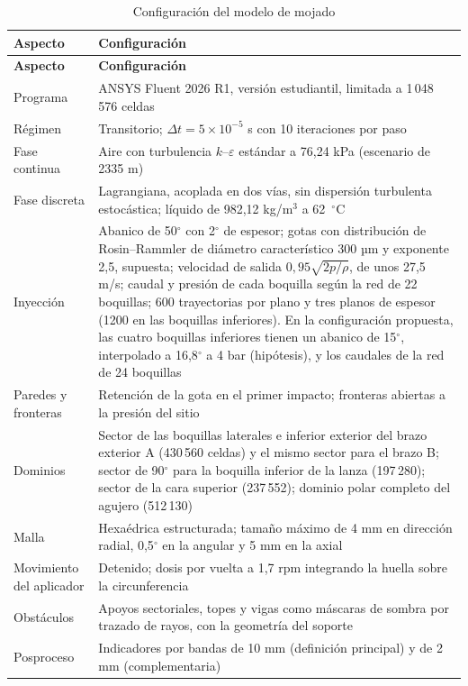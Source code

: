 \begingroup
\small\singlespacing
\setlength{\tabcolsep}{4pt}
\begin{longtable}{@{}>{\raggedright\arraybackslash}p{3.4cm}>{\raggedright\arraybackslash}p{\dimexpr\textwidth-3.4cm-4\tabcolsep\relax}@{}}
\caption{Configuración del modelo de mojado}\label{tab:anx-cfd-config}\\
\toprule
\textbf{Aspecto} & \textbf{Configuración}\\
\midrule\endfirsthead
\toprule
\textbf{Aspecto} & \textbf{Configuración}\\
\midrule\endhead
\bottomrule\endlastfoot
Programa & ANSYS Fluent 2026 R1, versión estudiantil, limitada a 1\,048\,576 celdas\\
Régimen & Transitorio; $\Delta t=5\times10^{-5}$ s con 10 iteraciones por paso\\
Fase continua & Aire con turbulencia $k$--$\varepsilon$ estándar a 76,24 kPa (escenario de 2335 m)\\
Fase discreta & Lagrangiana, acoplada en dos vías, sin dispersión turbulenta estocástica; líquido de 982,12 kg/m$^3$ a 62~$^\circ$C\\
Inyección & Abanico de 50$^\circ$ con 2$^\circ$ de espesor; gotas con distribución de Rosin--Rammler de diámetro característico 300 µm y exponente 2,5, supuesta; velocidad de salida $0{,}95\sqrt{2p/\rho}$, de unos 27,5 m/s; caudal y presión de cada boquilla según la red de 22 boquillas; 600 trayectorias por plano y tres planos de espesor (1200 en las boquillas inferiores). En la configuración propuesta, las cuatro boquillas inferiores tienen un abanico de 15$^\circ$, interpolado a 16,8$^\circ$ a 4 bar (hipótesis), y los caudales de la red de 24 boquillas\\
Paredes y fronteras & Retención de la gota en el primer impacto; fronteras abiertas a la presión del sitio\\
Dominios & Sector de las boquillas laterales e inferior exterior del brazo exterior A (430\,560 celdas) y el mismo sector para el brazo B; sector de 90$^\circ$ para la boquilla inferior de la lanza (197\,280); sector de la cara superior (237\,552); dominio polar completo del agujero (512\,130)\\
Malla & Hexaédrica estructurada; tamaño máximo de 4 mm en dirección radial, 0,5$^\circ$ en la angular y 5 mm en la axial\\
Movimiento del aplicador & Detenido; dosis por vuelta a 1,7 rpm integrando la huella sobre la circunferencia\\
Obstáculos & Apoyos sectoriales, topes y vigas como máscaras de sombra por trazado de rayos, con la geometría del soporte\\
Posproceso & Indicadores por bandas de 10 mm (definición principal) y de 2 mm (complementaria)\\
\end{longtable}
\endgroup

